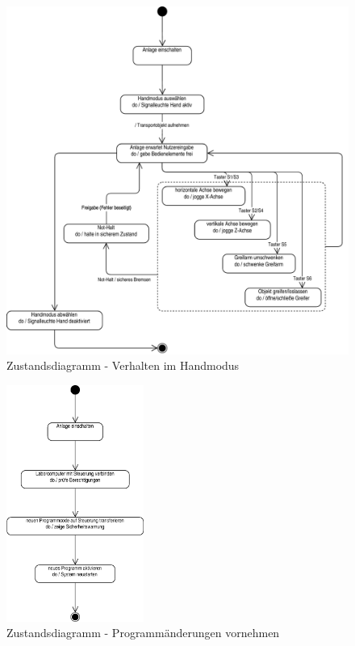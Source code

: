\documentclass[../Bachelorarbeit.tex]{subfiles}
\begin{document}
\begin{figure}[H]
    \centering
    \includegraphics[width=\textwidth]{Images/hand_zustand.pdf}
    \caption[Zustandsdiagramm Handmodus]{Zustandsdiagramm - Verhalten im Handmodus}
    \label{fig:my-img5}
\end{figure}

\begin{figure}[H]
    \centering
    \includegraphics[width=0.4\textwidth]{Images/programm_zustand.pdf}
    \caption[Zustandsdiagramm Programmänderungen]{Zustandsdiagramm - Programmänderungen vornehmen}
    \label{fig:my-img6}
\end{figure}
\end{document}
